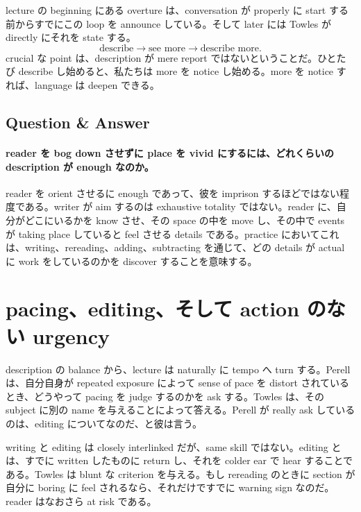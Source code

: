 lecture の beginning にある overture は、conversation が properly に start する前からすでにこの loop を announce している。そして later には Towles が directly にそれを state する。
\begin{equation}
\text{describe} \longrightarrow \text{see more} \longrightarrow \text{describe more}.
\end{equation}
crucial な point は、description が mere report ではないということだ。ひとたび describe し始めると、私たちは more を notice し始める。more を notice すれば、language は deepen できる。

\subsection{Question \& Answer}

\paragraph{reader を bog down させずに place を vivid にするには、どれくらいの description が enough なのか。}

reader を orient させるに enough であって、彼を imprison するほどではない程度である。writer が aim するのは exhaustive totality ではない。reader に、自分がどこにいるかを know させ、その space の中を move し、その中で events が taking place していると feel させる details である。practice においてこれは、writing、rereading、adding、subtracting を通じて、どの details が actual に work をしているのかを discover することを意味する。

\section{pacing、editing、そして action のない urgency}

description の balance から、lecture は naturally に tempo へ turn する。Perell は、自分自身が repeated exposure によって sense of pace を distort されているとき、どうやって pacing を judge するのかを ask する。Towles は、その subject に別の name を与えることによって答える。Perell が really ask しているのは、editing についてなのだ、と彼は言う。

writing と editing は closely interlinked だが、same skill ではない。editing とは、すでに written したものに return し、それを colder ear で hear することである。Towles は blunt な criterion を与える。もし rereading のときに section が自分に boring に feel されるなら、それだけですでに warning sign なのだ。reader はなおさら at risk である。

